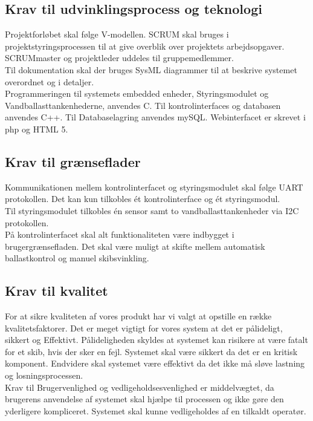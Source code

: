 \subsection{Krav til udvinklingsprocess og teknologi}
Projektforløbet skal følge V-modellen. SCRUM skal bruges i projektstyringsprocessen til at give overblik over projektets arbejdsopgaver. SCRUMmaster og projektleder uddeles til gruppemedlemmer.\\
Til dokumentation skal der bruges SysML diagrammer til at beskrive systemet overordnet og i detaljer.\\
Programmeringen til systemets embedded enheder, Styringsmodulet og Vandballasttankenhederne, anvendes C. Til kontrolinterfaces og databasen anvendes C++. Til Databaselagring anvendes mySQL. Webinterfacet er skrevet i php og HTML 5.

\subsection{Krav til grænseflader}
Kommunikationen mellem kontrolinterfacet og styringsmodulet skal følge UART protokollen. Det kan kun tilkobles ét kontrolinterface og ét styringsmodul.\\
Til styringsmodulet tilkobles én sensor samt to vandballasttankenheder via I2C protokollen.\\
På kontrolinterfacet skal alt funktionaliteten være indbygget i brugergrænsefladen. Det skal være muligt at skifte mellem automatisk ballastkontrol og manuel skibsvinkling. 

\subsection{Krav til kvalitet}
For at sikre kvaliteten af vores produkt har vi valgt at opstille en række kvalitetsfaktorer. Det er meget vigtigt for vores system at det er pålideligt, sikkert og Effektivt. Pålideligheden skyldes at systemet kan risikere at være fatalt for et skib, hvis der sker en fejl. Systemet skal være sikkert da det er en kritisk komponent. Endvidere skal systemet være effektivt da det ikke må sløve lastning og losningsprocessen.\\
Krav til Brugervenlighed og vedligeholdsesvenlighed er middelvægtet, da brugerens anvendelse af systemet skal hjælpe til processen og ikke gøre den yderligere kompliceret. Systemet skal kunne vedligeholdes af en tilkaldt operatør.\\
